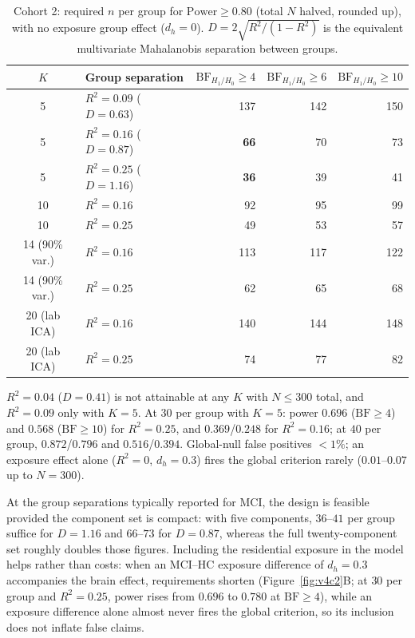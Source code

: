 \documentclass[11pt,a4paper]{article}
\newcommand{\BF}{\mathrm{BF}}
\begin{document}
\begin{table}[H]
\centering\small
\caption{Cohort 2: required $n$ per group for $\mathrm{Power}\ge0.80$ (total $N$ halved, rounded up), with no exposure group effect ($d_h=0$). $D=2\sqrt{R^{2}/(1-R^{2})}$ is the equivalent multivariate Mahalanobis separation between groups.}
\label{tab:v4c2}
\begin{tabular}{clrrr}
\toprule
$K$ & Group separation & $\BF_{H_1/H_0}\ge4$ & $\BF_{H_1/H_0}\ge6$ & $\BF_{H_1/H_0}\ge10$\\
\midrule
\rowcolor{RowGrey}
5 & $R^2=0.09$ ($D=0.63$) & 137 & 142 & 150\\
\rowcolor{RowGrey}
5 & $R^2=0.16$ ($D=0.87$) & \textbf{66} & 70 & 73\\
\rowcolor{RowGrey}
5 & $R^2=0.25$ ($D=1.16$) & \textbf{36} & 39 & 41\\
10 & $R^2=0.16$ & 92 & 95 & 99\\
10 & $R^2=0.25$ & 49 & 53 & 57\\
14 (90\% var.) & $R^2=0.16$ & 113 & 117 & 122\\
14 (90\% var.) & $R^2=0.25$ & 62 & 65 & 68\\
20 (lab ICA) & $R^2=0.16$ & 140 & 144 & 148\\
20 (lab ICA) & $R^2=0.25$ & 74 & 77 & 82\\
\bottomrule
\end{tabular}

\vspace{2pt}
{\footnotesize $R^{2}=0.04$ ($D=0.41$) is not attainable at any $K$ with $N\le300$ total, and $R^{2}=0.09$ only with $K=5$. At $30$ per group with $K=5$: power $0.696$ ($\BF\ge4$) and $0.568$ ($\BF\ge10$) for $R^{2}=0.25$, and $0.369$/$0.248$ for $R^{2}=0.16$; at $40$ per group, $0.872$/$0.796$ and $0.516$/$0.394$. Global-null false positives $<1\%$; an exposure effect alone ($R^{2}=0$, $d_h=0.3$) fires the global criterion rarely ($0.01$--$0.07$ up to $N=300$).}
\end{table}

At the group separations typically reported for MCI, the design is feasible provided the component set is compact: with five components, $36$--$41$ per group suffice for $D=1.16$ and $66$--$73$ for $D=0.87$, whereas the full twenty-component set roughly doubles those figures. Including the residential exposure in the model helps rather than costs: when an MCI--HC exposure difference of $d_h=0.3$ accompanies the brain effect, requirements shorten (Figure~\ref{fig:v4c2}B; at $30$ per group and $R^{2}=0.25$, power rises from $0.696$ to $0.780$ at $\BF\ge4$), while an exposure difference alone almost never fires the global criterion, so its inclusion does not inflate false claims.
\end{document}
